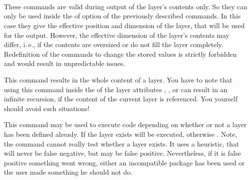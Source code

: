 \begin{Declaration}
  \\
  \\
  \\
\end{Declaration}
%
%
%
%
These commands are valid during output of the layer's contents only. So they
can only be used inside the  of option  of the
previously described commands. In this case they give the effective position
and dimension of the layer, that will be used for the output. However, the
effective dimension of the layer's contents may differ, i.\,e., if the
contents are oversized or do not fill the layer completely. Redefinition of
the commands to change the stored values is strictly forbidden and would
result in unpredictable issues.%
%
%
%
%

\ifnum{}\else
\begin{Declaration}
\end{Declaration}
%
This command results in the whole content
of a layer. You have to note that using this
command inside the  of the layer attributes ,
, or  can result in
an infinite recursion, if the content of the current layer is referenced. You
yourself should avoid such situations!%
%
\fi

\begin{Declaration}
\end{Declaration}
%
This command may be used to execute code depending on whether or not a layer
has been defined already. If the layer exists  will be
executed, otherwise . Note, the command cannot really
test whether a layer exists. It uses a heuristic, that will never be false
negative, but may be false positive. Nevertheless, if it is false positive
something went wrong, either an incompatible package has been used or the user
made something he should not do.%

